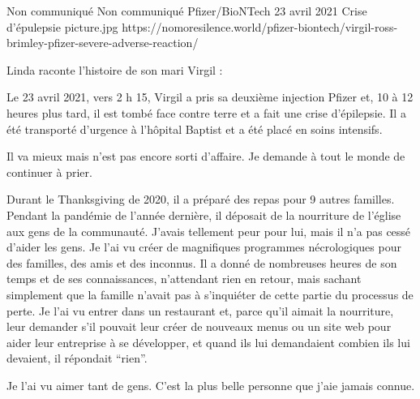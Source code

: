 {Non communiqué}
{Non communiqué}
{Pfizer/BioNTech}
{23 avril 2021}
{Crise d'épulepsie}
{picture.jpg}
{https://nomoresilence.world/pfizer-biontech/virgil-ross-brimley-pfizer-severe-adverse-reaction/}
{

Linda raconte l'histoire de son mari Virgil :

Le 23 avril 2021, vers 2 h 15, Virgil a pris sa deuxième injection Pfizer et, 10
à 12 heures plus tard, il est tombé face contre terre et a fait une crise
d'épilepsie. Il a été transporté d'urgence à l'hôpital Baptist et a été placé en
soins intensifs.

Il va mieux mais n'est pas encore sorti d'affaire. Je demande à tout le monde de
continuer à prier.

Durant le Thanksgiving de 2020, il a préparé des repas pour 9 autres
familles. Pendant la pandémie de l'année dernière, il déposait de la nourriture
de l'église aux gens de la communauté. J'avais tellement peur pour lui, mais il
n'a pas cessé d'aider les gens. Je l'ai vu créer de magnifiques programmes
nécrologiques pour des familles, des amis et des inconnus. Il a donné de
nombreuses heures de son temps et de ses connaissances, n'attendant rien en
retour, mais sachant simplement que la famille n'avait pas à s'inquiéter de
cette partie du processus de perte. Je l'ai vu entrer dans un restaurant et,
parce qu'il aimait la nourriture, leur demander s'il pouvait leur créer de
nouveaux menus ou un site web pour aider leur entreprise à se développer, et
quand ils lui demandaient combien ils lui devaient, il répondait “rien”.

Je l'ai vu aimer tant de gens. C'est la plus belle personne que j'aie jamais
connue.

}
